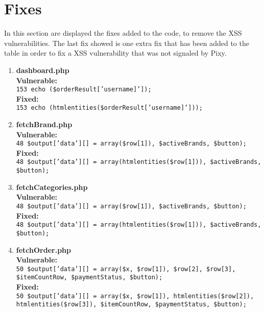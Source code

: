 \documentclass[11pt]{article}
\begin{document}
\section{Fixes}
In this section are displayed the fixes added to the code, to remove the XSS vulnerabilities.
The last fix showed is one extra fix that has been added to the table in order to fix a XSS vulnerability that was not signaled by Pixy. 

\begin{enumerate}
	\item \textbf{dashboard.php} \\
	\textbf{Vulnerable:} \\ 
		\texttt{153 echo (\$orderResult['username]']);} \\
	\textbf{Fixed:} \\
	 	\texttt{153 echo (htmlentities(\$orderResult['username]']));} 
	
	\item \textbf{fetchBrand.php} \\
	\textbf{Vulnerable:} \\ 
		\texttt{48 \$output['data'][] = array(\$row[1]), \$activeBrands, \$button);} \\
	\textbf{Fixed:} \\
		\texttt{48 \$output['data'][] = array(htmlentities(\$row[1])), \$activeBrands, \$button);} \\
	
	\item \textbf{fetchCategories.php} \\
	\textbf{Vulnerable:} \\ 
		\texttt{48 \$output['data'][] = array(\$row[1]), \$activeBrands, \$button);} \\
	\textbf{Fixed:} \\
		\texttt{48 \$output['data'][] = array(htmlentities(\$row[1])), \$activeBrands, \$button);} \\

	\item \textbf{fetchOrder.php} \\
	\textbf{Vulnerable:} \\ 
		\texttt{50 \$output['data'][] = array(\$x, \$row[1]), \$row[2], \$row[3], \$itemCountRow, \$paymentStatus, \$button);} \\
	\textbf{Fixed:} \\
		\texttt{50 \$output['data'][] = array(\$x, \$row[1]), htmlentities(\$row[2]), htmlentities(\$row[3]), \$itemCountRow, \$paymentStatus, \$button);} \\



\end{enumerate}
\end{document}
